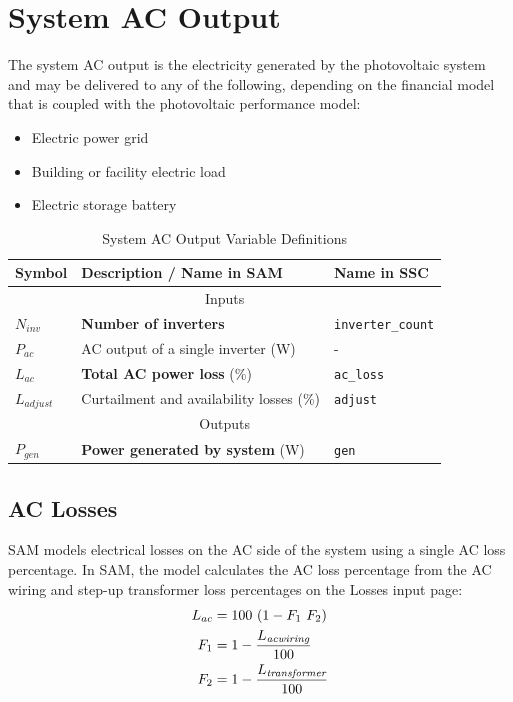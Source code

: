 \documentclass[12pt,letterpaper]{article}
\begin{document}
\chapter{System AC Output}\label{sec-acoutput}

The system AC output is the electricity generated by the photovoltaic system and may be delivered to any of the following, depending on the financial model that is coupled with the photovoltaic performance model:
\begin{itemize}
\item Electric power grid
\item Building or facility electric load
\item Electric storage battery
\end{itemize}
\begin{table}
\begin{center}
\caption{System AC Output Variable Definitions}
\begin{tabular}{lll}
\midrule
Symbol & Description / \textbf{Name in SAM} & Name in SSC \\
\midrule
\multicolumn{3}{c}{Inputs}\\
$N_{inv}$ & \textbf{Number of inverters} & \texttt{inverter\_count} \\
$P_{ac}$ & AC output of a single inverter (W)& - \\
$L_{ac}$ & \textbf{Total AC power loss} (\%)& \texttt{ac\_loss} \\
$L_{\textit{adjust}}$ & Curtailment and availability losses (\%)& \texttt{adjust} \\
\midrule
\multicolumn{3}{c}{Outputs}\\
$P_{\textit{gen}}$& \textbf{Power generated by system}  (W)& \texttt{gen} \\
\hline
\end{tabular}
\label{tab-systemacoutputvars}
\end{center}
\end{table}

\section{AC Losses}\label{sec-aclosses}

SAM models electrical losses on the AC side of the system using a single AC loss percentage.  In SAM, the model calculates the AC loss percentage from the AC wiring and step-up transformer loss percentages on the Losses input page:
\begin{align}\label{eqn-acderate}
L_{ac} &= 100~(1-F_1~F_2)\notag\\
F_{1} &= 1-\frac{L_{\textit{acwiring}}}{100} \notag\\
F_{2} &= 1-\frac{L_{\textit{transformer}}}{100}
\end{align}
\end{document}
